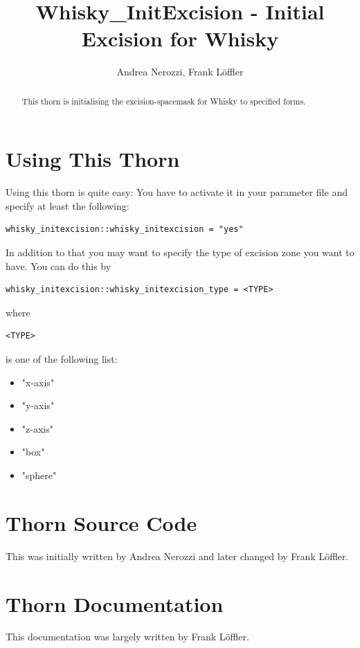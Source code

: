 \documentclass{article}
\begin{document}
\title{Whisky\_InitExcision - Initial Excision for Whisky}

\author{Andrea Nerozzi, Frank L\"offler}

\maketitle




\begin{abstract}
  This thorn is initialising the excision-spacemask for Whisky to
  specified forms.
\end{abstract}


\section{Using This Thorn}

Using this thorn is quite easy:
You have to activate it in your parameter file and specify at least the
following:

\begin{verbatim}
whisky_initexcision::whisky_initexcision = "yes"
\end{verbatim}

In addition to that you may want to specify the type of excision zone
you want to have. You can do this by

\begin{verbatim}
whisky_initexcision::whisky_initexcision_type = <TYPE>
\end{verbatim}

where \begin{verbatim}<TYPE>\end{verbatim} is one of the following list:
\begin{itemize}
 \item "x-axis"
 \item "y-axis"
 \item "z-axis"
 \item "box"
 \item "sphere"
\end{itemize}

\section{Thorn Source Code}

This was initially written by Andrea Nerozzi and later changed
by Frank L\"offler.

\section{Thorn Documentation}

This documentation was largely written by Frank L\"offler.

\end{document}
